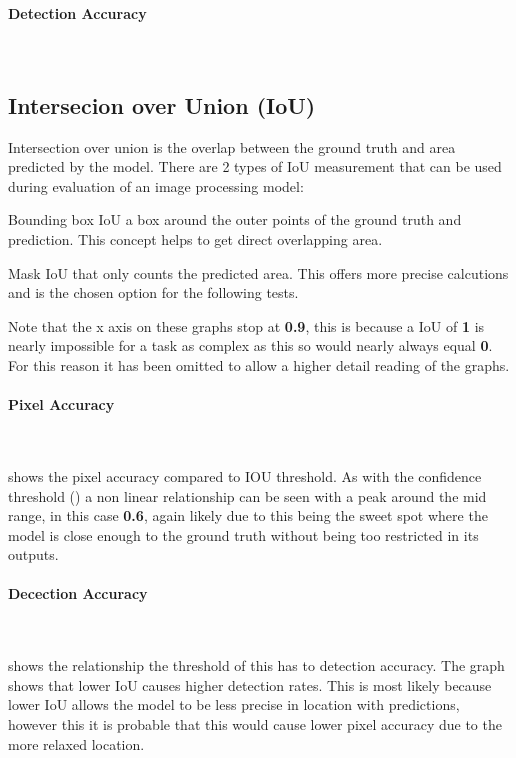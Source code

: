 \documentclass[final]{cmpreport_02}
\begin{document}
\paragraph{Detection Accuracy} \



\subsection{Intersecion over Union (IoU)}
Intersection over union is the overlap between the ground truth and area predicted by the model.
There are 2 types of IoU measurement that can be used during evaluation of an image processing model:

Bounding box IoU a box around the outer points of the ground truth and prediction.
This concept helps to get direct overlapping area.

Mask IoU that only counts the predicted area. This offers more precise calcutions and is the chosen option for the following tests.

Note that the x axis on these graphs stop at \textbf{0.9}, this is because a IoU of \textbf{1} is nearly impossible for a task as complex as this so would nearly always equal \textbf{0}. For this reason it has been omitted to allow a higher detail reading of the graphs.

\paragraph{Pixel Accuracy} \

 shows the pixel accuracy compared to IOU threshold. 
As with the confidence threshold () a non linear relationship can be seen with a peak around the mid range, in this case \textbf{0.6}, again likely due to this being the sweet spot where the model is close enough to the ground truth without being too restricted in its outputs.

\paragraph{Decection Accuracy} \

 shows the relationship the threshold of this has to detection accuracy. 
The graph shows that lower IoU causes higher detection rates.
This is most likely because lower IoU allows the model to be less precise in location with predictions, however this it is probable that this would cause lower pixel accuracy due to the more relaxed location. 
\end{document}
